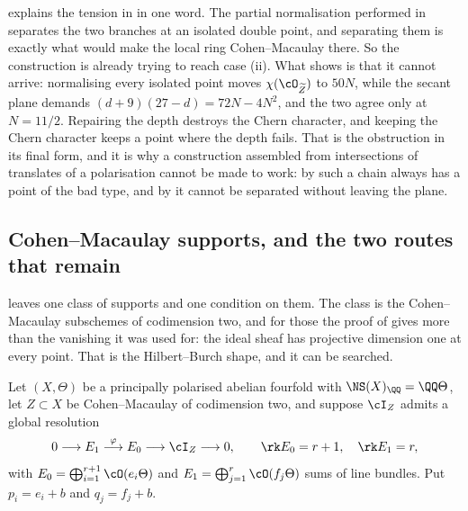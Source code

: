 \begin{remark}%
\label{rem:normalisationcm}
 explains the tension in  in
one word. The partial normalisation performed in 
separates the two branches at an isolated double point, and separating them is
exactly what would make the local ring Cohen--Macaulay there. So the
construction is already trying to reach case (ii). What
 shows is that it cannot arrive: normalising every
isolated point moves $\chi(\cO_{\widetilde Z})$ to $50N$, while the secant
plane demands $(d+9)(27-d)=72N-4N^{2}$, and the two agree only at $N=11/2$.
Repairing the depth destroys the Chern character, and keeping the Chern
character keeps a point where the depth fails. That is the obstruction in its
final form, and it is why a construction assembled from intersections of
translates of a polarisation cannot be made to work: by
 such a chain always has a point of the bad type,
and by  it cannot be separated without leaving the
plane.
\end{remark}

\subsection{Cohen--Macaulay supports, and the two routes that remain}
\label{ssec:hilbertburch}

 leaves one class of supports and one condition on them.
The class is the Cohen--Macaulay subschemes of codimension two, and for those
the proof of  gives more than the vanishing it was used
for: the ideal sheaf has projective dimension one at every point. That is the
Hilbert--Burch shape, and it can be searched.

\begin{setupenv}\label{setup:burch}
Let $(X,\Theta)$ be a principally polarised abelian fourfold with
$\NS(X)_{\QQ}=\QQ\Theta$, let $Z\subset X$ be Cohen--Macaulay of codimension
two, and suppose $\cI_{Z}$ admits a global resolution
\begin{equation}\label{eq:burchres}
  0\longrightarrow E_{1}\stackrel{\varphi}{\longrightarrow}E_{0}
  \longrightarrow\cI_{Z}\longrightarrow0,
  \qquad \rk E_{0}=r+1,\quad\rk E_{1}=r,
\end{equation}
with $E_{0}=\bigoplus_{i=1}^{r+1}\cO(e_{i}\Theta)$ and
$E_{1}=\bigoplus_{j=1}^{r}\cO(f_{j}\Theta)$ sums of line bundles. Put
$p_{i}=e_{i}+b$ and $q_{j}=f_{j}+b$.
\end{setupenv}

